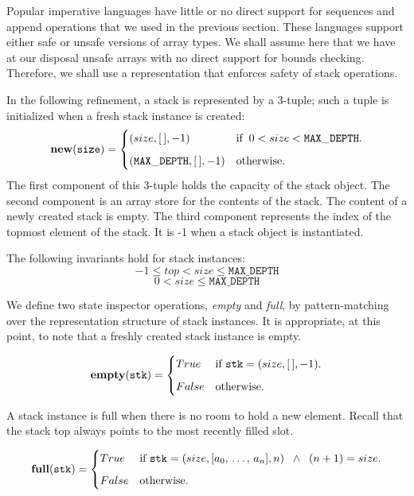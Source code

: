 \documentclass[10pt]{article}
\begin{document}
    Popular imperative languages have little or no direct support for sequences and append operations that we used in the previous section. These languages support either safe or unsafe versions of array types. We shall assume here that we have at our disposal unsafe arrays with no direct support for bounds checking. Therefore, we shall use a representation that enforces safety of stack operations.

    In the following refinement, a stack is represented by a 3-tuple; such a tuple is initialized when a fresh stack instance is created:
    \[
        \mathtt{\mathbf{new}(size)} = \begin{cases} (size, [\,], -1) &\mbox{if\;\;} 0 < size < \mathtt{MAX\_DEPTH}. \vspace*{6pt}\\ 
        (\mathtt{MAX\_DEPTH}, [\,], -1) & \mbox{otherwise}. \end{cases} 
    \]
    The first component of this 3-tuple holds the capacity of the stack object. The second component is an array store for the contents of the stack. The content of a newly created stack is empty. The third component represents the index of the topmost element of the stack. It is -1 when a stack object is instantiated. 

    The following invariants hold for stack instances:
    \[
        -1 \leq top < size \leq \mathtt{MAX\_DEPTH}
    \]
    \[
        0 < size \leq \mathtt{MAX\_DEPTH}
    \]
    
    We define two state inspector operations, \emph{empty} and \emph{full}, by pattern-matching over the representation structure of stack instances. It is appropriate, at this point, to note that a freshly created stack instance is empty.

    \[
        \mathtt{\mathbf{empty}(stk)} = \begin{cases} True & \mbox{if  } \mathtt{stk} = (size, [\,], -1). \vspace*{6pt}\\ 
        False & \mbox{otherwise}. \end{cases} 
    \]

    A stack instance is full when there is no room to hold a new element. Recall that the stack top always points to the most recently filled slot.

    \[
        \mathtt{\mathbf{full}(stk)} = \begin{cases} True & \mbox{if  } \mathtt{stk} = (size, [a_0, \, \ldots, \, a_n], n)  \;\; \wedge \;\; (n+1) = size. \vspace*{6pt}\\ 
        False & \mbox{otherwise}. \end{cases} 
    \]
    
\end{document}
